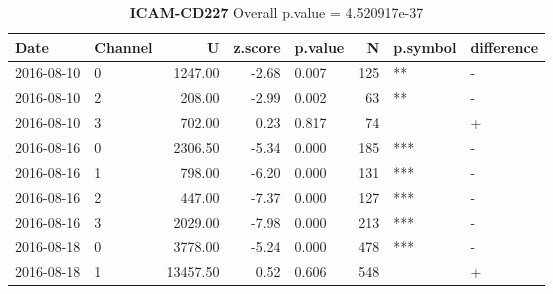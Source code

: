 \begin{table}[ht]
\caption[ICAM-CD227]{\textbf{ICAM-CD227} Overall p.value = 4.520917e-37}
\centering
\begin{tabular}{llrrlrll}
  \hline
Date & Channel & U & z.score & p.value & N & p.symbol & difference \\ 
  \hline
2016-08-10 & 0 & 1247.00 & -2.68 & 0.007 & 125 & ** & - \\ 
  2016-08-10 & 2 & 208.00 & -2.99 & 0.002 &  63 & ** & - \\ 
  2016-08-10 & 3 & 702.00 & 0.23 & 0.817 &  74 &  & + \\ 
  2016-08-16 & 0 & 2306.50 & -5.34 & 0.000 & 185 & *** & - \\ 
  2016-08-16 & 1 & 798.00 & -6.20 & 0.000 & 131 & *** & - \\ 
  2016-08-16 & 2 & 447.00 & -7.37 & 0.000 & 127 & *** & - \\ 
  2016-08-16 & 3 & 2029.00 & -7.98 & 0.000 & 213 & *** & - \\ 
  2016-08-18 & 0 & 3778.00 & -5.24 & 0.000 & 478 & *** & - \\ 
  2016-08-18 & 1 & 13457.50 & 0.52 & 0.606 & 548 &  & + \\ 
   \hline
\end{tabular}
\end{table}
